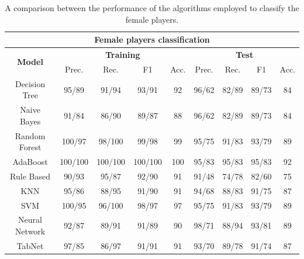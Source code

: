 \begin{table}[H]
\footnotesize
\centering
\begin{tabular}{c|c|c|c|c|c|c|c|c}\hline \hline
\multicolumn{9}{c}{\textbf{Female players classification}}\\ \hline \hline
\multirow{2}{*}{\textbf{Model}} & \multicolumn{4}{c|}{\textbf{Training}} & \multicolumn{4}{c}{\textbf{Test}} \\\cline{2-9}
& Prec. & Rec. & F1 & Acc. & Prec. & Rec. & F1 & Acc. \\\hline
Decision Tree & 95/89 & 91/94 & 93/91 & 92 & 96/62 & 82/89 & 89/73 & 84 \\
Naive Bayes & 91/84 & 86/90 & 89/87 & 88 & 96/62 & 82/89 & 89/73 & 84\\
\rowcolor{brown!50} Random Forest & 100/97 & 98/100 & 99/98 & 99 & 95/75 & 91/83 & 93/79 & 89\\
\rowcolor{yellow!70} AdaBoost & 100/100& 100/100 & 100/100 & 100 & 95/83 & 95/83 & 95/83 & 92\\
Rule Based & 90/93 & 95/87 & 92/90 & 91 & 91/48 & 74/78 & 82/60 & 75\\
KNN & 95/86 & 88/95 & 91/90 & 91 & 94/68 & 88/83 & 91/75 & 87\\
\rowcolor{brown!50} SVM & 100/95 & 96/100 & 98/97 & 97& 95/75 & 91/83 & 93/79 & 89\\
\rowcolor{gray!40} Neural Network & 92/87 & 89/91 & 91/89 & 90 & 98/71 & 88/94 & 93/81 & 89\\
TabNet & 97/85 & 86/97 & 91/91 & 91 & 93/70 & 89/78 & 91/74 & 87\\\hline \hline
\end{tabular}
\caption{A comparison between the performance of the algorithms employed to classify the female players.}
\label{tab:female_compare}
\end{table}

